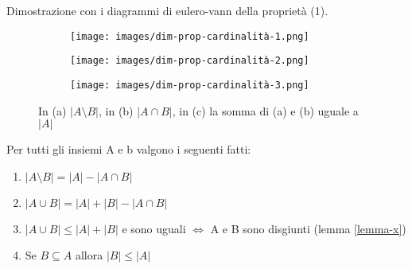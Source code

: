 \begin{demostration}
Dimostrazione con i diagrammi di eulero-vann della proprietà (1).
\end{demostration}
\begin{figure}[h!]
    \vspace{-5pt}
    \centering
    \begin{subfigure}{.3\textwidth}
        \centering
        \texttt{[image: images/dim-prop-cardinalità-1.png]}
        \caption{}
    \end{subfigure}
    \hfill
    \begin{subfigure}{.3\textwidth}
        \centering
        \texttt{[image: images/dim-prop-cardinalità-2.png]}
        \caption{}
    \end{subfigure}
    \hfill
    \begin{subfigure}{.3\textwidth}
        \centering
        \texttt{[image: images/dim-prop-cardinalità-3.png]}
        \caption{}
    \end{subfigure}
    \caption{In (a) $|A\setminus B|$, in (b) $|A\cap B|$, in (c) la somma di (a) e (b) uguale a $|A|$}
\end{figure}

\begin{corollar}
Per tutti gli insiemi A e b valgono i seguenti fatti:
\begin{enumerate}
    \item $|A \setminus B| = |A| - |A\cap B|$
    \item $|A \cup B| = |A| + |B| - |A \cap B|$
    \item $|A \cup B| \leq |A| + |B|$ e sono uguali $\Longleftrightarrow$ A e B sono disgiunti (lemma \ref{lemma-x})
    \item Se $B \subseteq A$ allora $|B| \leq |A|$
\end{enumerate}
\end{corollar}

